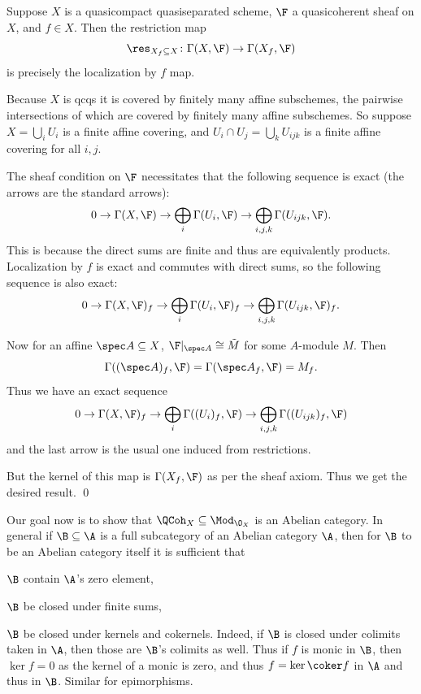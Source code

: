 \blemm[title={The Qcqs lemma}, name={qcqslemm}]

    Suppose $X$ is a quasicompact quasiseparated scheme, $\F$ a quasicoherent sheaf on $X$, and $f\in X$.
    Then the restriction map
    $$ \res_{X_f\subseteq X} \colon \Gamma(X,\F) \to \Gamma(X_f,\F) $$
    is precisely the localization by $f$ map.

\elemm

\bproof

    Because $X$ is qcqs it is covered by finitely many affine subschemes, the pairwise intersections of which are covered by finitely many affine subschemes.
    So suppose $X=\bigcup_iU_i$ is a finite affine covering, and $U_i\cap U_j=\bigcup_kU_{ijk}$ is a finite affine covering for all $i,j$.

    The sheaf condition on $\F$ necessitates that the following sequence is exact (the arrows are the standard arrows):
    $$ 0 \to \Gamma(X,\F) \to \bigoplus_i\Gamma(U_i,\F) \to \bigoplus_{i,j,k}\Gamma(U_{ijk},\F) . $$
    This is because the direct sums are finite and thus are equivalently products.
    Localization by $f$ is exact and commutes with direct sums, so the following sequence is also exact:
    $$ 0 \to \Gamma(X,\F)_f \to \bigoplus_i\Gamma(U_i,\F)_f \to \bigoplus_{i,j,k}\Gamma(U_{ijk},\F)_f . $$

    Now for an affine $\spec A\subseteq X$, $\F|_{\spec A}\cong\tilde M$ for some $A$-module $M$.
    Then
    $$ \Gamma((\spec A)_f,\F) = \Gamma(\spec A_f,\F) = M_f . $$
    Thus we have an exact sequence
    $$ 0 \to \Gamma(X,\F)_f \to \bigoplus_i\Gamma((U_i)_f,\F) \to \bigoplus_{i,j,k}\Gamma((U_{ijk})_f,\F) $$
    and the last arrow is the usual one induced from restrictions.

    But the kernel of this map is $\Gamma(X_f,\F)$ as per the sheaf axiom.
    Thus we get the desired result.
    \qed

\eproof

Our goal now is to show that $\QCoh_X\subseteq\Mod_{\O_X}$ is an Abelian category.
In general if $\B\subseteq\A$ is a full subcategory of an Abelian category $\A$, then for $\B$ to be an Abelian category itself it is sufficient that
\benum
    \item $\B$ contain $\A$'s zero element,
    \item $\B$ be closed under finite sums,
    \item $\B$ be closed under kernels and cokernels.
\eenum
Indeed, if $\B$ is closed under colimits taken in $\A$, then those are $\B$'s colimits as well.
Thus if $f$ is monic in $\B$, then $\ker f=0$ as the kernel of a monic is zero, and thus $f=\ker\coker f$ in $\A$ and thus in $\B$.
Similar for epimorphisms.

